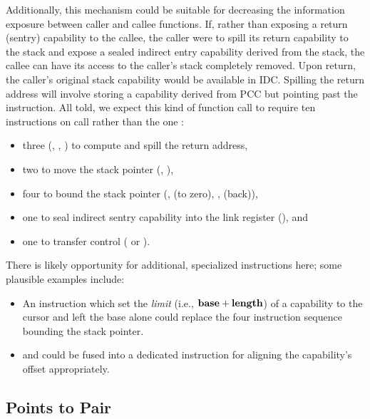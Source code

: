 Additionally, this mechanism could be suitable for decreasing the information
exposure between caller and callee functions.  If, rather than exposing a return
(sentry) capability to the callee, the caller were to spill its return
capability to the stack and expose a sealed indirect entry capability derived
from the stack, the callee can have its access to the caller's stack completely
removed.  Upon return, the caller's original stack capability would be
available in IDC.  Spilling the return address will involve storing a
capability derived from PCC but pointing past the 
instruction.  All told, we expect this kind of function call to require ten
instructions on call rather than the one :
%
\begin{itemize}

	\item three (, ,
		) to compute and spill the return address,

	\item two to move the stack pointer
		(,
		),

	\item four to bound the stack pointer (,
		 (to zero), ,
		 (back)),

	\item one to seal indirect sentry capability into the link register
		(), and

	\item one to transfer control ( or
		).

\end{itemize}
%
There is likely opportunity for additional, specialized instructions here;
some plausible examples include:
%
\begin{itemize}
%
  \item An instruction which set the \emph{limit} (i.e., ${\bf base} +
  {\bf length}$) of a capability to the cursor and left the base alone could
  replace the four instruction sequence bounding the stack pointer.
%
  \item {} and 
  could be fused into a dedicated instruction for aligning the capability's
  offset appropriately.
%
\end{itemize}

\subsection{Points to Pair} %


